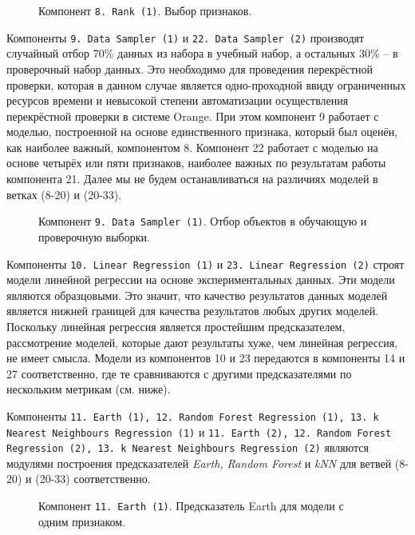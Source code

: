 \begin{figure}[H]
    \caption{Компонент \texttt{8. Rank (1)}. Выбор признаков.}
    \label{img:8-Rank-1}
\end{figure}

Компоненты \texttt{9. Data Sampler (1)} и \texttt{22. Data Sampler (2)} производят случайный отбор 70\% данных из набора в учебный набор, а остальных 30\% -- в проверочный набор данных. Это необходимо для проведения перекрёстной проверки, которая в данном случае является одно-проходной ввиду ограниченных ресурсов времени и невысокой степени автоматизации осуществления перекрёстной проверки в системе Orange. При этом компонент 9 работает с моделью, построенной на основе единственного признака, который был оценён, как наиболее важный, компонентом 8. Компонент 22 работает с моделью на основе четырёх или пяти признаков, наиболее важных по результатам работы компонента 21. Далее мы не будем останавливаться на различиях моделей в ветках (8-20) и (20-33).

\begin{figure}[H]
    \caption{Компонент \texttt{9. Data Sampler (1)}. Отбор объектов в обучающую и проверочную выборки.}
    \label{img:9-Data-Sampler-1}
\end{figure}

Компоненты \texttt{10. Linear Regression (1)} и \texttt{23. Linear Regression (2)} строят модели линейной регрессии на основе экспериментальных данных. Эти модели являются образцовыми. Это значит, что качество результатов данных моделей является нижней границей для качества результатов любых других моделей. Поскольку линейная регрессия является простейшим предсказателем, рассмотрение моделей, которые дают результаты хуже, чем линейная регрессия, не имеет смысла. Модели из компонентов 10 и 23 передаются в компоненты 14 и 27 соответственно, где те сравниваются с другими предсказателями по нескольким метрикам (см. ниже).

Компоненты \texttt{11. Earth (1), 12. Random Forest Regression (1), 13. k Nearest Neighbours Regression (1)} и \texttt{11. Earth (2), 12. Random Forest Regression (2), 13. k Nearest Neighbours Regression (2)} являются модулями построения предсказателей \textit{Earth, Random Forest} и \textit{kNN} для ветвей (8-20) и (20-33) соответственно.

\begin{figure}[H]
    \caption{Компонент \texttt{11. Earth (1)}. Предсказатель Earth для модели с одним признаком.}
    \label{img:11-Earth-1}
\end{figure}

